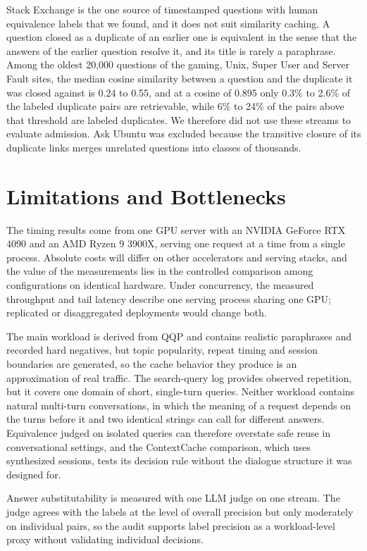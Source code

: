 \documentclass[authoryear,preprint,review,12pt]{elsarticle}
\begin{document}
Stack Exchange is the one source of timestamped questions with human equivalence labels that we found, and it does not suit similarity caching. A question closed as a duplicate of an earlier one is equivalent in the sense that the answers of the earlier question resolve it, and its title is rarely a paraphrase. Among the oldest 20,000 questions of the gaming, Unix, Super User and Server Fault sites, the median cosine similarity between a question and the duplicate it was closed against is 0.24 to 0.55, and at a cosine of 0.895 only 0.3\% to 2.6\% of the labeled duplicate pairs are retrievable, while 6\% to 24\% of the pairs above that threshold are labeled duplicates. We therefore did not use these streams to evaluate admission. Ask Ubuntu was excluded because the transitive closure of its duplicate links merges unrelated questions into classes of thousands.

\section{Limitations and Bottlenecks}
\label{sec:limitations}
The timing results come from one GPU server with an NVIDIA GeForce RTX 4090 and an AMD Ryzen 9 3900X, serving one request at a time from a single process. Absolute costs will differ on other accelerators and serving stacks, and the value of the measurements lies in the controlled comparison among configurations on identical hardware. Under concurrency, the measured throughput and tail latency describe one serving process sharing one GPU; replicated or disaggregated deployments would change both.

The main workload is derived from QQP and contains realistic paraphrases and recorded hard negatives, but topic popularity, repeat timing and session boundaries are generated, so the cache behavior they produce is an approximation of real traffic. The search-query log provides observed repetition, but it covers one domain of short, single-turn queries. Neither workload contains natural multi-turn conversations, in which the meaning of a request depends on the turns before it and two identical strings can call for different answers. Equivalence judged on isolated queries can therefore overstate safe reuse in conversational settings, and the ContextCache comparison, which uses synthesized sessions, tests its decision rule without the dialogue structure it was designed for.

Answer substitutability is measured with one LLM judge on one stream. The judge agrees with the labels at the level of overall precision but only moderately on individual pairs, so the audit supports label precision as a workload-level proxy without validating individual decisions.
\end{document}
